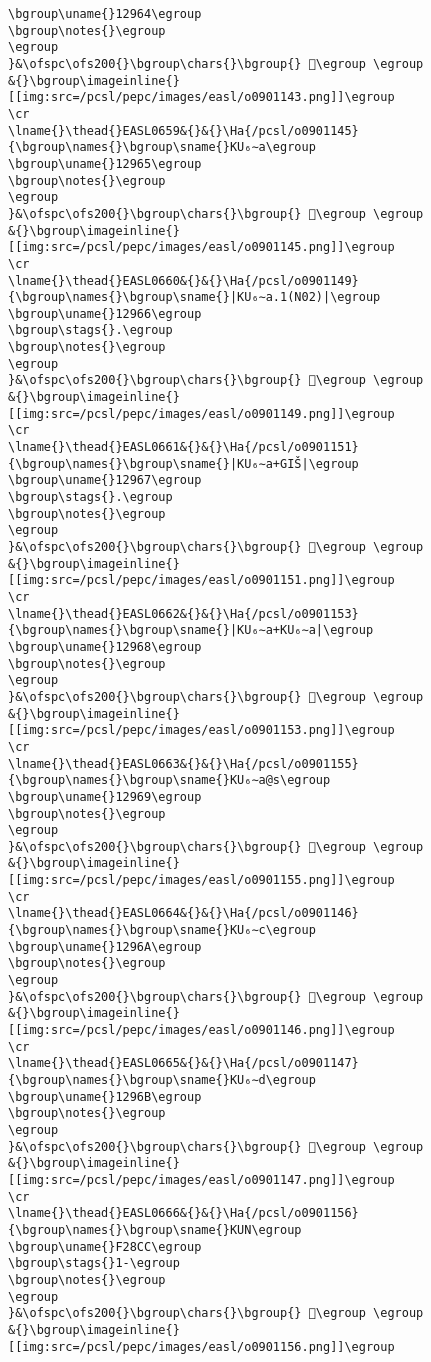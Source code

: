 \begin{verbatim}
\bgroup\uname{}12964\egroup
\bgroup\notes{}\egroup
\egroup
}&\ofspc\ofs200{}\bgroup\chars{}\bgroup{} 𒥤\egroup \egroup
&{}\bgroup\imageinline{}[[img:src=/pcsl/pepc/images/easl/o0901143.png]]\egroup
\cr
\lname{}\thead{}EASL0659&{}&{}\Ha{/pcsl/o0901145}{\bgroup\names{}\bgroup\sname{}KU₆∼a\egroup
\bgroup\uname{}12965\egroup
\bgroup\notes{}\egroup
\egroup
}&\ofspc\ofs200{}\bgroup\chars{}\bgroup{} 𒥥\egroup \egroup
&{}\bgroup\imageinline{}[[img:src=/pcsl/pepc/images/easl/o0901145.png]]\egroup
\cr
\lname{}\thead{}EASL0660&{}&{}\Ha{/pcsl/o0901149}{\bgroup\names{}\bgroup\sname{}|KU₆∼a.1(N02)|\egroup
\bgroup\uname{}12966\egroup
\bgroup\stags{}.\egroup
\bgroup\notes{}\egroup
\egroup
}&\ofspc\ofs200{}\bgroup\chars{}\bgroup{} 𒥦\egroup \egroup
&{}\bgroup\imageinline{}[[img:src=/pcsl/pepc/images/easl/o0901149.png]]\egroup
\cr
\lname{}\thead{}EASL0661&{}&{}\Ha{/pcsl/o0901151}{\bgroup\names{}\bgroup\sname{}|KU₆∼a+GIŠ|\egroup
\bgroup\uname{}12967\egroup
\bgroup\stags{}.\egroup
\bgroup\notes{}\egroup
\egroup
}&\ofspc\ofs200{}\bgroup\chars{}\bgroup{} 𒥧\egroup \egroup
&{}\bgroup\imageinline{}[[img:src=/pcsl/pepc/images/easl/o0901151.png]]\egroup
\cr
\lname{}\thead{}EASL0662&{}&{}\Ha{/pcsl/o0901153}{\bgroup\names{}\bgroup\sname{}|KU₆∼a+KU₆∼a|\egroup
\bgroup\uname{}12968\egroup
\bgroup\notes{}\egroup
\egroup
}&\ofspc\ofs200{}\bgroup\chars{}\bgroup{} 𒥨\egroup \egroup
&{}\bgroup\imageinline{}[[img:src=/pcsl/pepc/images/easl/o0901153.png]]\egroup
\cr
\lname{}\thead{}EASL0663&{}&{}\Ha{/pcsl/o0901155}{\bgroup\names{}\bgroup\sname{}KU₆∼a@s\egroup
\bgroup\uname{}12969\egroup
\bgroup\notes{}\egroup
\egroup
}&\ofspc\ofs200{}\bgroup\chars{}\bgroup{} 𒥩\egroup \egroup
&{}\bgroup\imageinline{}[[img:src=/pcsl/pepc/images/easl/o0901155.png]]\egroup
\cr
\lname{}\thead{}EASL0664&{}&{}\Ha{/pcsl/o0901146}{\bgroup\names{}\bgroup\sname{}KU₆∼c\egroup
\bgroup\uname{}1296A\egroup
\bgroup\notes{}\egroup
\egroup
}&\ofspc\ofs200{}\bgroup\chars{}\bgroup{} 𒥪\egroup \egroup
&{}\bgroup\imageinline{}[[img:src=/pcsl/pepc/images/easl/o0901146.png]]\egroup
\cr
\lname{}\thead{}EASL0665&{}&{}\Ha{/pcsl/o0901147}{\bgroup\names{}\bgroup\sname{}KU₆∼d\egroup
\bgroup\uname{}1296B\egroup
\bgroup\notes{}\egroup
\egroup
}&\ofspc\ofs200{}\bgroup\chars{}\bgroup{} 𒥫\egroup \egroup
&{}\bgroup\imageinline{}[[img:src=/pcsl/pepc/images/easl/o0901147.png]]\egroup
\cr
\lname{}\thead{}EASL0666&{}&{}\Ha{/pcsl/o0901156}{\bgroup\names{}\bgroup\sname{}KUN\egroup
\bgroup\uname{}F28CC\egroup
\bgroup\stags{}1-\egroup
\bgroup\notes{}\egroup
\egroup
}&\ofspc\ofs200{}\bgroup\chars{}\bgroup{} 󲣌\egroup \egroup
&{}\bgroup\imageinline{}[[img:src=/pcsl/pepc/images/easl/o0901156.png]]\egroup

\end{verbatim}
